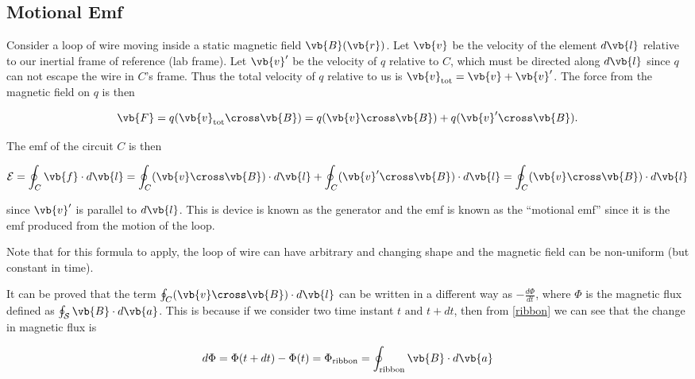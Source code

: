 \documentclass[english,a4paper,12pt]{report}
\begin{document}
\subsection{Motional Emf}
Consider a loop of wire moving inside a static magnetic field \(\vb{B} (\vb{r} )\). Let \(\vb{v} \) be the velocity of the element \(d \vb{l} \) relative to our inertial frame of reference (lab frame). Let \(\vb{v} '\) be the velocity of \(q\) relative to \(C\), which must be directed along \(d \vb{l} \) since \(q\) can not escape the wire in \(C\)'s frame. Thus the total velocity of \(q\) relative to us is \(\vb{v} _{\text{tot} } = \vb{v} + \vb{v} ' \). The force from the magnetic field on \(q\) is then

\begin{equation}
    \vb{F} = q(\vb{v} _{\text{tot} } \cross \vb{B} ) = q (\vb{v} \cross \vb{B} ) + q (\vb{v} ' \cross \vb{B} ).
\end{equation}

The emf of the circuit \(C\) is then 

\begin{equation}
    \mathcal{E} = \oint_{C} \vb{f} \cdot d \vb{l} = \oint_{C} (\vb{v} \cross \vb{B} ) \cdot d \vb{l}  + \oint_{C} (\vb{v} ' \cross \vb{B} ) \cdot d \vb{l} = \oint_{C} (\vb{v} \cross \vb{B} ) \cdot d \vb{l} 
\end{equation}

since \(\vb{v} '\) is parallel to \(d \vb{l} \). This is device is known as the generator and the emf is known as the ``motional emf'' since it is the emf produced from the motion of the loop.

Note that for this formula to apply, the loop of wire can have arbitrary and changing shape and the magnetic field can be non-uniform (but constant in time). 

It can be proved that the term \(\oint_{C} (\vb{v} \cross \vb{B} ) \cdot  d \vb{l} \) can be written in a different way as \(-\frac{d\Phi }{dt} \), where \(\Phi \) is the magnetic flux defined as \(\oint_{\mathcal{S}} \vb{B} \cdot d\vb{a}  \). This is because if we consider two time instant \(t \text { and } t+dt\), then from \cref{ribbon} we can see that the change in magnetic flux is


\begin{equation}
    d\Phi = \Phi (t+dt) - \Phi (t) = \Phi _{\text{ribbon}} = \oint_{\text{ribbon} } \vb{B} \cdot d \vb{a} 
\end{equation}
\end{document}

